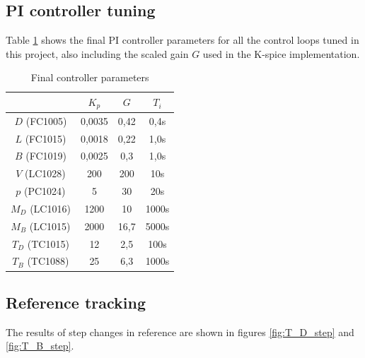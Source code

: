 \documentclass[12pt]{article}
\begin{document}
\subsection{PI controller tuning}
Table \ref{tab:final_controller_parameters} shows the final PI controller parameters for all the control loops tuned in this project, also including the scaled gain $G$ used in the K-spice implementation.

\begin{table}
\centering
\begin{tabular}{c | c | c | c }
& $K_p$ & $G$ & $T_i$ \\ \hline
$D$ (FC1005) & 0,0035 & 0,42& 0,4s\\
$L$ (FC1015) & 0,0018 & 0,22 & 1,0s \\
$B$ (FC1019) & 0,0025 & 0,3 & 1,0s \\
$V$ (LC1028) & 200 & 200 & 10s \\
$p$ (PC1024) & 5 & 30 & 20s \\
$M_D$ (LC1016) & 1200 & 10 & 1000s \\
$M_B$ (LC1015) & 2000 & 16,7 & 5000s \\
$T_D$ (TC1015) & 12 & 2,5 & 100s \\
$T_B$ (TC1088) & 25 & 6,3 & 1000s
\end{tabular}
\caption{Final controller parameters}
\label{tab:final_controller_parameters}
\end{table}

\subsection{Reference tracking}
The results of step changes in reference are shown in figures \ref{fig:T_D_step} and \ref{fig:T_B_step}.
\end{document}
